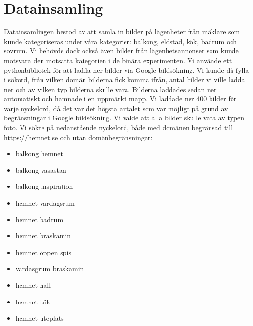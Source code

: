 \documentclass[]{kththesis}
\begin{document}
\section{Datainsamling}
Datainsamlingen bestod av att samla in bilder på lägenheter från mäklare som kunde kategoriseras under våra kategorier: balkong, eldstad, kök, badrum och sovrum. Vi behövde dock också även bilder från lägenhetsannonser som kunde motsvara den motsatta kategorien i de binära experimenten. Vi använde ett pythonbibliotek \parencite{google_image} för att ladda ner bilder via Google bildsökning. Vi kunde då fylla i sökord, från vilken domän bilderna fick komma ifrån, antal bilder vi ville ladda ner och av vilken typ bilderna skulle vara. Bilderna laddades sedan ner automatiskt och hamnade i en uppmärkt mapp. Vi laddade ner 400 bilder för varje nyckelord, då det var det högsta antalet som var möjligt på grund av begränsningar i Google bildsökning. Vi valde att alla bilder skulle vara av typen foto. Vi sökte på nedanstående nyckelord, både med domänen begränsad till https://hemnet.se och utan domänbegränsningar:
\begin{itemize}
  \item balkong hemnet
  \item balkong vasastan
  \item balkong inspiration
  \item hemnet vardagsrum
  \item hemnet badrum
  \item hemnet braskamin
  \item hemnet öppen spis
  \item vardasgrum braskamin
  \item hemnet hall
  \item hemnet kök
  \item hemnet uteplats
\end{itemize}
\end{document}
